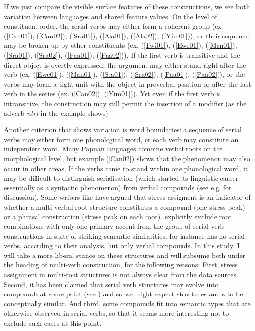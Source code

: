 If we just compare the visible surface features of these constructions, we see both variation between languages and shared feature values. On the level of constituent order, the serial verbs may either form a coherent group (ex. (\ref{Can01}), (\ref{Can02}), (\ref{Sra01}), (\ref{Ala01}), (\ref{Ala02}), (\ref{Yim01})), or their sequence may be broken up by other constituents (ex. (\ref{Twi01}), (\ref{Ewe01}), (\ref{Man01}), (\ref{Sra01}), (\ref{Sra02}), (\ref{Paa01}), (\ref{Paa02})). If the first verb is transitive and the direct object is overtly expressed, the argument may either stand right after the verb (ex. (\ref{Ewe01}), (\ref{Man01}), (\ref{Sra01}), (\ref{Sra02}), (\ref{Paa01}), (\ref{Paa02})), or the verbs may form a tight unit with the object in preverbal position or after the last verb in the series (ex. (\ref{Can02}), (\ref{Yim01})). Yet even if the first verb is intransitive, the construction may still permit the insertion of a modifier (as the adverb \textit{ntm} in the  example shows). 

Another criterion that shows variation is word boundaries: a sequence of serial verbs may either form one phonological word, or each verb may constitute an independent word. Many Papuan languages combine verbal roots on the morphological level, but example (\ref{Can02}) shows that the phenomenon may also occur in other areas. If the verbs come to stand within one phonological word, it may be difficult to distinguish serialisation (which started its linguistic career essentially as a syntactic phenomenon) from verbal compounds (see e.g. \citealt{vanstaden2008serial} for discussion). Some writers like \citet{devries2004} have argued that stress assigment is an indicator of whether a multi-verbal root structure constitutes a compound (one stress peak) or a phrasal construction (stress peak on each root). \citet{vanstaden2008serial} explicitly exclude root combinations with only one primary accent from the group of serial verb constructions in spite of striking semantic similarities.  for instance has no serial verbs, according to their analysis, but only verbal compounds. In this study, I will take a more liberal stance on these structures and will subsume both under the heading of multi-verb construction, for the following reasons: First, stress assignment in multi-root structures is not always clear from the data sources. Second, it has been claimed that serial verb structures may evolve into compounds at some point (see \citealt[27]{vanstaden2008serial}) and so we might expect  structures and s to be conceptually similar. And third, some compounds fit into semantic types that are otherwise observed in serial verbs, so that it seems more interesting not to exclude such cases at this point. 

